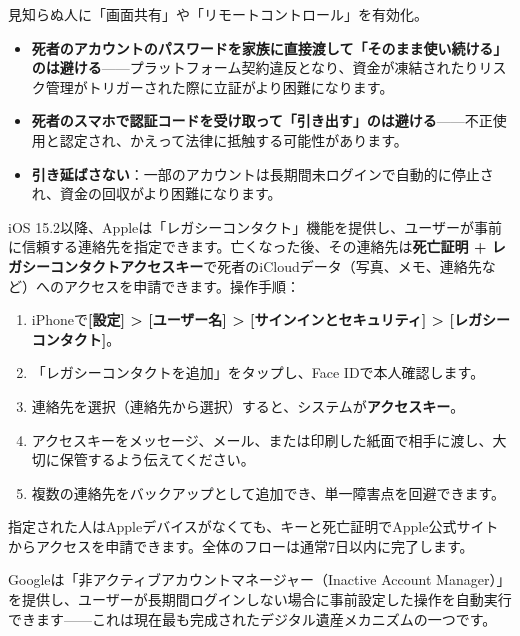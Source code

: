 \begin{tcbwarn}{見知らぬ人に「画面共有」や「リモートコントロール」を有効化。}
\begin{itemize}
  \item \textbf{死者のアカウントのパスワードを家族に直接渡して「そのまま使い続ける」のは避ける}——プラットフォーム契約違反となり、資金が凍結されたりリスク管理がトリガーされた際に立証がより困難になります。
  \item \textbf{死者のスマホで認証コードを受け取って「引き出す」のは避ける}——不正使用と認定され、かえって法律に抵触する可能性があります。
  \item \textbf{引き延ばさない}：一部のアカウントは長期間未ログインで自動的に停止され、資金の回収がより困難になります。
\end{itemize}

\end{tcbwarn}


iOS 15.2以降、Appleは「レガシーコンタクト」機能を提供し、ユーザーが事前に信頼する連絡先を指定できます。亡くなった後、その連絡先は\textbf{死亡証明 + レガシーコンタクトアクセスキー}で死者のiCloudデータ（写真、メモ、連絡先など）へのアクセスを申請できます。操作手順：

\begin{enumerate}
  \item iPhoneで\textbf{[設定] > [ユーザー名] > [サインインとセキュリティ] > [レガシーコンタクト]}。
  \item 「レガシーコンタクトを追加」をタップし、Face IDで本人確認します。
  \item 連絡先を選択（連絡先から選択）すると、システムが\textbf{アクセスキー}。
  \item アクセスキーをメッセージ、メール、または印刷した紙面で相手に渡し、大切に保管するよう伝えてください。
  \item 複数の連絡先をバックアップとして追加でき、単一障害点を回避できます。
\end{enumerate}

指定された人はAppleデバイスがなくても、キーと死亡証明でApple公式サイトからアクセスを申請できます。全体のフローは通常7日以内に完了します。


Googleは「非アクティブアカウントマネージャー（Inactive Account Manager）」を提供し、ユーザーが長期間ログインしない場合に事前設定した操作を自動実行できます——これは現在最も完成されたデジタル遺産メカニズムの一つです。


